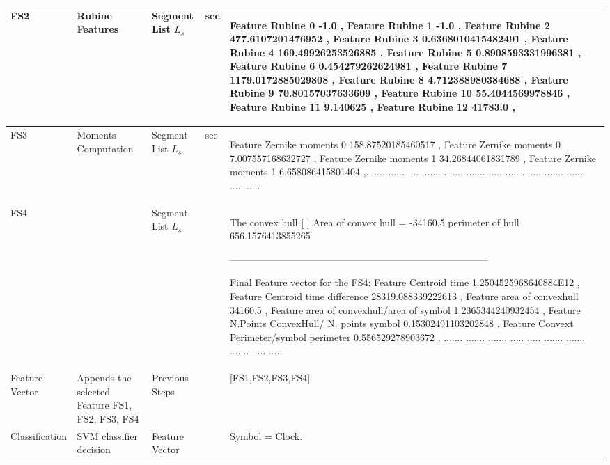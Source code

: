 \begin{landscape}
\begin{scriptsize}
\begin{longtable}{|p{2cm}|p{2cm}|p{5cm}|p{2cm}|p{10cm}|}
 \\ \hline
FS2  & Rubine Features & Segment List $L_s$  &   see \cite{gestureexample12}   & 
\begin{scriptsize}
 Feature Rubine 0 -1.0   ,    Feature Rubine 1 -1.0   ,    Feature Rubine 2 477.6107201476952   ,    Feature Rubine 3 0.6368010415482491   ,    Feature Rubine 4 169.49926253526885   ,    Feature Rubine 5 0.8908593331996381   ,    Feature Rubine 6 0.454279262624981   ,    Feature Rubine 7 1179.0172885029808   ,    Feature Rubine 8 4.712388980384688   ,    Feature Rubine 9 70.80157037633609   ,    Feature Rubine 10 55.4044569978846   ,    Feature Rubine 11 9.140625   ,    Feature Rubine 12 41783.0   ,   
\end{scriptsize}
 \\ \hline
 
FS3 & Moments Computation   &  Segment List $L_s$  &  see \cite{zernike61}  &

\begin{scriptsize}
   Feature Zernike moments 0 158.87520185460517   ,    Feature Zernike moments 0 7.007557168632727   ,    Feature Zernike moments 1 34.26844061831789   ,    Feature Zernike moments 1 6.658086415801404   ,....... ...... .... ....... ....... ....... ..... ..... ....... ....... ....... ..... .....
\end{scriptsize}
  
  \\ \hline
FS4   &  &Segment List $L_s$   &  &  \begin{scriptsize} 
 The convex hull    [ ]
 Area of convex hull =  -34160.5   perimeter of hull 656.1576413855265
 
 --------------------------------------------------------------------------------
 
Final Feature vector for the FS4: 
  Feature Centroid time 1.2504525968640884E12  , Feature Centroid time difference 28319.088339222613   ,    Feature area of convexhull 34160.5   ,    Feature area of convexhull/area of symbol 1.2365344240932454   ,    Feature N.Points ConvexHull/ N. points symbol 0.15302491103202848   ,    Feature Convext Perimeter/symbol perimeter 0.556529278903672   ,    ....... ....... ....... ..... ..... ....... ....... ....... ..... .....
  \end{scriptsize}
    \\ \hline
 Feature Vector & Appends the selected Feature FS1, FS2, FS3, FS4 & Previous Steps  & & 
 
  [FS1,FS2,FS3,FS4]  \\ \hline
   Classification  & SVM classifier decision & Feature Vector  &  & 
   Symbol = Clock.  
 
 \\ \hline
   
 		\end{longtable}


\end{scriptsize}
\end{landscape}